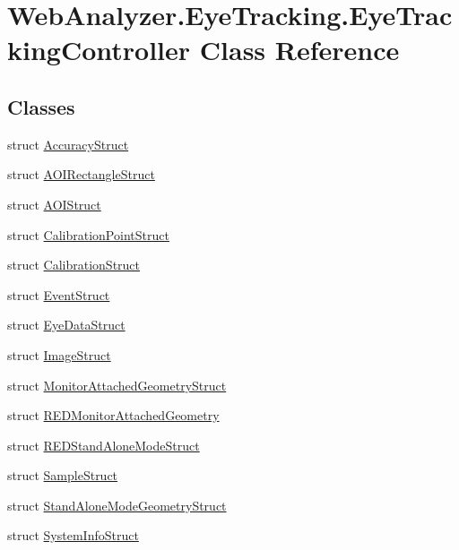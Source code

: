 \hypertarget{class_web_analyzer_1_1_eye_tracking_1_1_eye_tracking_controller}{}\section{Web\+Analyzer.\+Eye\+Tracking.\+Eye\+Tracking\+Controller Class Reference}
\label{class_web_analyzer_1_1_eye_tracking_1_1_eye_tracking_controller}
\subsection*{Classes}
\begin{DoxyCompactItemize}
\item 
struct \hyperlink{struct_web_analyzer_1_1_eye_tracking_1_1_eye_tracking_controller_1_1_accuracy_struct}{Accuracy\+Struct}
\item 
struct \hyperlink{struct_web_analyzer_1_1_eye_tracking_1_1_eye_tracking_controller_1_1_a_o_i_rectangle_struct}{A\+O\+I\+Rectangle\+Struct}
\item 
struct \hyperlink{struct_web_analyzer_1_1_eye_tracking_1_1_eye_tracking_controller_1_1_a_o_i_struct}{A\+O\+I\+Struct}
\item 
struct \hyperlink{struct_web_analyzer_1_1_eye_tracking_1_1_eye_tracking_controller_1_1_calibration_point_struct}{Calibration\+Point\+Struct}
\item 
struct \hyperlink{struct_web_analyzer_1_1_eye_tracking_1_1_eye_tracking_controller_1_1_calibration_struct}{Calibration\+Struct}
\item 
struct \hyperlink{struct_web_analyzer_1_1_eye_tracking_1_1_eye_tracking_controller_1_1_event_struct}{Event\+Struct}
\item 
struct \hyperlink{struct_web_analyzer_1_1_eye_tracking_1_1_eye_tracking_controller_1_1_eye_data_struct}{Eye\+Data\+Struct}
\item 
struct \hyperlink{struct_web_analyzer_1_1_eye_tracking_1_1_eye_tracking_controller_1_1_image_struct}{Image\+Struct}
\item 
struct \hyperlink{struct_web_analyzer_1_1_eye_tracking_1_1_eye_tracking_controller_1_1_monitor_attached_geometry_struct}{Monitor\+Attached\+Geometry\+Struct}
\item 
struct \hyperlink{struct_web_analyzer_1_1_eye_tracking_1_1_eye_tracking_controller_1_1_r_e_d_monitor_attached_geometry}{R\+E\+D\+Monitor\+Attached\+Geometry}
\item 
struct \hyperlink{struct_web_analyzer_1_1_eye_tracking_1_1_eye_tracking_controller_1_1_r_e_d_stand_alone_mode_struct}{R\+E\+D\+Stand\+Alone\+Mode\+Struct}
\item 
struct \hyperlink{struct_web_analyzer_1_1_eye_tracking_1_1_eye_tracking_controller_1_1_sample_struct}{Sample\+Struct}
\item 
struct \hyperlink{struct_web_analyzer_1_1_eye_tracking_1_1_eye_tracking_controller_1_1_stand_alone_mode_geometry_struct}{Stand\+Alone\+Mode\+Geometry\+Struct}
\item 
struct \hyperlink{struct_web_analyzer_1_1_eye_tracking_1_1_eye_tracking_controller_1_1_system_info_struct}{System\+Info\+Struct}
\end{DoxyCompactItemize}
